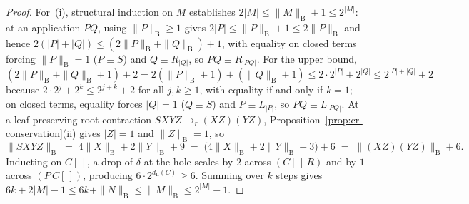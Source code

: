 \documentclass[11pt,reqno]{amsart}
\numberwithin{equation}{section}
\theoremstyle{plain}
\theoremstyle{definition}
\theoremstyle{remark}
\begin{document}
\begin{proof}
For~(i), structural induction on $M$ establishes $2|M| \le \|M\|_{\mathrm{B}} + 1 \le 2^{|M|}$: at an application $P Q$, using $\|P\|_{\mathrm{B}} \ge 1$ gives $2|P| \le \|P\|_{\mathrm{B}} + 1 \le 2\|P\|_{\mathrm{B}}$ and hence $2(|P| + |Q|) \le (2\|P\|_{\mathrm{B}} + \|Q\|_{\mathrm{B}}) + 1$, with equality on closed terms forcing $\|P\|_{\mathrm{B}} = 1$ ($P \equiv S$) and $Q \equiv R_{|Q|}$, so $P Q \equiv R_{|P Q|}$. For the upper bound, $(2\|P\|_{\mathrm{B}} + \|Q\|_{\mathrm{B}} + 1) + 2 = 2(\|P\|_{\mathrm{B}} + 1) + (\|Q\|_{\mathrm{B}} + 1) \le 2 \cdot 2^{|P|} + 2^{|Q|} \le 2^{|P|+|Q|} + 2$ because $2 \cdot 2^j + 2^k \le 2^{j+k} + 2$ for all $j, k \ge 1$, with equality if and only if $k = 1$; on closed terms, equality forces $|Q| = 1$ ($Q \equiv S$) and $P \equiv L_{|P|}$, so $P Q \equiv L_{|P Q|}$. At a leaf-preserving root contraction $S X Y Z \to_r (X Z)(Y Z)$, Proposition~\ref{prop:cr-conservation}(ii) gives $|Z| = 1$ and $\|Z\|_{\mathrm{B}} = 1$, so
\[
  \|S X Y Z\|_{\mathrm{B}} \;=\; 4\|X\|_{\mathrm{B}} + 2\|Y\|_{\mathrm{B}} + 9 \;=\; \bigl(4\|X\|_{\mathrm{B}} + 2\|Y\|_{\mathrm{B}} + 3\bigr) + 6 \;=\; \|(X Z)(Y Z)\|_{\mathrm{B}} + 6.
\]
Inducting on $C[\,]$, a drop of $\delta$ at the hole scales by $2$ across $(C[\,]\,R)$ and by $1$ across $(P\,C[\,])$, producing $6 \cdot 2^{d_{\mathrm{L}}(C)} \ge 6$. Summing over $k$ steps gives $6k + 2|M| - 1 \le 6k + \|N\|_{\mathrm{B}} \le \|M\|_{\mathrm{B}} \le 2^{|M|} - 1$.


\end{proof}
\end{document}
